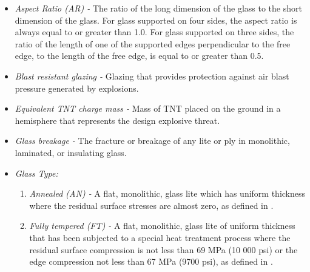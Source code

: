 \documentclass[12pt]{article}
\begin{document}
\begin{itemize}
\item \textit{Aspect Ratio (AR) -} The ratio of the long dimension of the
  glass to the short dimension of the glass.  For glass supported on four sides,
  the aspect ratio is always equal to or greater than 1.0. For glass supported
  on three sides, the ratio of the length of one of the supported edges
  perpendicular to the free edge, to the length of the free edge, is equal to or
  greater than 0.5.
  
\item \textit{Blast resistant glazing -} Glazing that provides protection 
against air blast pressure generated by explosions.

\item \textit{Equivalent TNT charge mass -} Mass of TNT placed on the ground in 
a hemisphere that represents the design explosive threat. 

\item \textit{Glass breakage -} The fracture or breakage of any lite or ply in
monolithic, laminated, or insulating glass.  
  
\item \textit{Glass Type:}
\begin{enumerate}

\item \textit{Annealed (AN) -} A flat, monolithic, glass lite which has uniform 
thickness where the residual surface stresses are almost zero, as defined in 
\cite{ASTM2016}.

\item \textit{Fully tempered (FT) -} A flat, monolithic, glass lite of 
uniform thickness that has been subjected to a special heat treatment process 
where the residual surface compression is not less than 69 MPa (10 000 psi) or 
the edge compression not less than 67 MPa (9700 psi), as defined in \cite{ASTM2012a}.


\end{enumerate}
\end{itemize}
\end{document}
